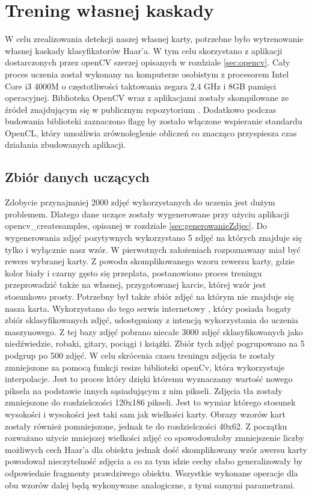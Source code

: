 \documentclass{article}
\let\stdsection\section
\renewcommand\section{\newpage\stdsection}
\numberwithin{equation}{section}
\begin{document}
\section{Trening własnej kaskady}

W celu zrealizowania detekcji naszej własnej karty, potrzebne było wytrenowanie własnej kaskady klasyfikatorów Haar'a. W tym celu skorzystano z aplikacji dostarczonych przez openCV szerzej opisanych w rozdziale \ref{sec:opencv}. Cały proces uczenia został wykonany na komputerze osobistym z procesorem Intel Core i3 4000M o częstotliwości taktowania zegara 2,4 GHz i 8GB pamięci operacyjnej. Biblioteka OpenCV wraz z aplikacjami zostały skompilowane ze źródeł znajdującym się w publicznym repozytorium \cite{OpenCVSource}. Dodatkowo podczas budowania biblioteki zaznaczono flagę by zostało włączone wspieranie standardu OpenCL, który umożliwia zrównoleglenie obliczeń co znacząco przyspiesza czas działania zbudowanych aplikacji.

\subsection{Zbiór danych uczących}

Zdobycie przynajmniej 2000 zdjęć wykorzystanych do uczenia jest dużym problemem. Dlatego dane uczące zostały wygenerowane przy użyciu aplikacji opencv\_createsamples, opisanej w rozdziale \ref{sec:generowanieZdjec}. Do wygenerowania zdjęć pozytywnych wykorzystano 5 zdjęć na których znajduje się tylko i wyłącznie nasz wzór. W pierwotnych założeniach rozpoznawany miał być rewers wybranej karty. Z powodu skomplikowanego wzoru rewersu karty, gdzie kolor biały i czarny gęsto się przeplata, postanowiono proces treningu przeprowadzić także na własnej, przygotowanej karcie, której wzór jest stosunkowo prosty. Potrzebny był także zbiór zdjęć na którym nie znajduje się nasza karta. Wykorzystano do tego serwis internetowy \cite{imageNetOrg}, który posiada bogaty zbiór sklasyfikowanych zdjęć, udostępniony z intencją wykorzystania do uczenia maszynowego. Z tej bazy zdjęć pobrano niecałe 3000 zdjęć sklasyfikowanych jako niedźwiedzie, robaki, gitary, pociągi i książki. Zbiór tych zdjęć pogrupowano na 5 podgrup po 500 zdjęć. W celu skrócenia czasu treningu zdjęcia te zostały zmniejszone za pomocą funkcji resize biblioteki openCv, która wykorzystuje interpolacje. Jest to proces który dzięki któremu wyznaczamy wartość nowego piksela na podstawie innych sąsiadującym z nim pikseli. Zdjęcia tła zostały zmniejszone do rozdzielczości 120x186 pikseli. Jest to wymiar którego stosunek wysokości i wysokości jest taki sam jak wielkości karty. Obrazy wzorów kart zostały również pomniejszone, jednak te do rozdzielczości 40x62. Z początku rozważano użycie mniejszej wielkości zdjęć co spowodowałoby zmniejszenie liczby możliwych cech Haar'a dla obiektu jednak dość skomplikowany wzór awersu karty powodował nieczytelność zdjęcia a co za tym idzie cechy słabo generalizowały by odpowiednie fragmenty prawdziwego obiektu. Wszystkie wykonane operacje dla obu wzorów dalej będą wykonywane analogiczne, z tymi samymi parametrami.
\end{document}

